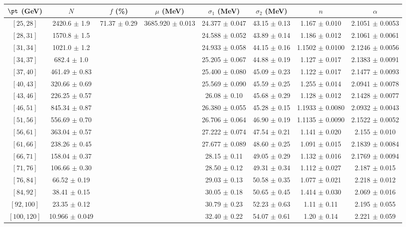 \begin{tabular}{c||c|c|c|c|c|c|c}
$\pt$ (GeV) & $N$ & $f$ (\%) & $\mu$ (MeV) & $\sigma_1$ (MeV) & $\sigma_2$ (MeV) & $n$ & $\alpha$ \\
\hline
$[25, 28]$ & 2420.6 $\pm$ 1.9 & \multirow{17}{*}{71.37 $\pm$ 0.29} & \multirow{17}{*}{3685.920 $\pm$ 0.013} & 24.377 $\pm$ 0.047 & 43.15 $\pm$ 0.13 & 1.167 $\pm$ 0.010 & 2.1051 $\pm$ 0.0053\\
$[28, 31]$ & 1570.8 $\pm$ 1.5 &  &  & 24.588 $\pm$ 0.052 & 43.89 $\pm$ 0.14 & 1.186 $\pm$ 0.012 & 2.1061 $\pm$ 0.0061\\
$[31, 34]$ & 1021.0 $\pm$ 1.2 &  &  & 24.933 $\pm$ 0.058 & 44.15 $\pm$ 0.16 & 1.1502 $\pm$ 0.0100 & 2.1246 $\pm$ 0.0056\\
$[34, 37]$ & 682.4 $\pm$ 1.0 &  &  & 25.205 $\pm$ 0.067 & 44.88 $\pm$ 0.19 & 1.127 $\pm$ 0.017 & 2.1383 $\pm$ 0.0091\\
$[37, 40]$ & 461.49 $\pm$ 0.83 &  &  & 25.400 $\pm$ 0.080 & 45.09 $\pm$ 0.23 & 1.122 $\pm$ 0.017 & 2.1477 $\pm$ 0.0093\\
$[40, 43]$ & 320.66 $\pm$ 0.69 &  &  & 25.569 $\pm$ 0.090 & 45.59 $\pm$ 0.25 & 1.255 $\pm$ 0.014 & 2.0941 $\pm$ 0.0078\\
$[43, 46]$ & 226.25 $\pm$ 0.57 &  &  & 26.08 $\pm$ 0.10 & 45.68 $\pm$ 0.29 & 1.128 $\pm$ 0.012 & 2.1428 $\pm$ 0.0077\\
$[46, 51]$ & 845.34 $\pm$ 0.87 &  &  & 26.380 $\pm$ 0.055 & 45.28 $\pm$ 0.15 & 1.1933 $\pm$ 0.0080 & 2.0932 $\pm$ 0.0043\\
$[51, 56]$ & 556.69 $\pm$ 0.70 &  &  & 26.706 $\pm$ 0.064 & 46.90 $\pm$ 0.19 & 1.1135 $\pm$ 0.0090 & 2.1522 $\pm$ 0.0052\\
$[56, 61]$ & 363.04 $\pm$ 0.57 &  &  & 27.222 $\pm$ 0.074 & 47.54 $\pm$ 0.21 & 1.141 $\pm$ 0.020 & 2.155 $\pm$ 0.010\\
$[61, 66]$ & 238.26 $\pm$ 0.45 &  &  & 27.677 $\pm$ 0.089 & 48.60 $\pm$ 0.25 & 1.091 $\pm$ 0.015 & 2.1839 $\pm$ 0.0084\\
$[66, 71]$ & 158.04 $\pm$ 0.37 &  &  & 28.15 $\pm$ 0.11 & 49.05 $\pm$ 0.29 & 1.132 $\pm$ 0.016 & 2.1769 $\pm$ 0.0094\\
$[71, 76]$ & 106.66 $\pm$ 0.30 &  &  & 28.50 $\pm$ 0.12 & 49.31 $\pm$ 0.34 & 1.112 $\pm$ 0.027 & 2.187 $\pm$ 0.015\\
$[76, 84]$ & 66.52 $\pm$ 0.19 &  &  & 29.03 $\pm$ 0.13 & 50.58 $\pm$ 0.35 & 1.077 $\pm$ 0.021 & 2.218 $\pm$ 0.012\\
$[84, 92]$ & 38.41 $\pm$ 0.15 &  &  & 30.05 $\pm$ 0.18 & 50.65 $\pm$ 0.45 & 1.414 $\pm$ 0.030 & 2.069 $\pm$ 0.016\\
$[92, 100]$ & 23.35 $\pm$ 0.12 &  &  & 30.79 $\pm$ 0.23 & 52.23 $\pm$ 0.63 & 1.11 $\pm$ 0.11 & 2.195 $\pm$ 0.055\\
$[100, 120]$ & 10.966 $\pm$ 0.049 &  &  & 32.40 $\pm$ 0.22 & 54.07 $\pm$ 0.61 & 1.20 $\pm$ 0.14 & 2.221 $\pm$ 0.059\\
\end{tabular}
